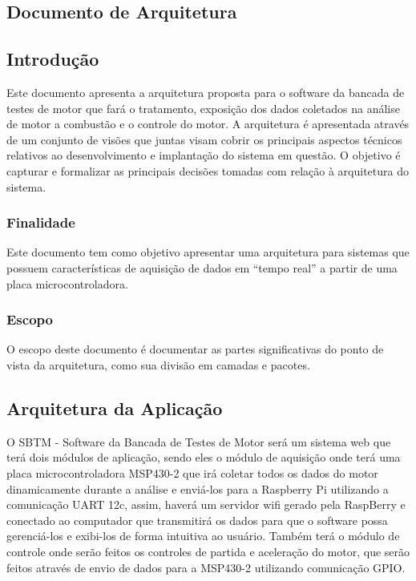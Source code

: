 \begin{anexosenv}
\chapter{Documento de Arquitetura}
\label{anexoB}

\section{Introdução}

Este documento apresenta a arquitetura proposta para o software da bancada de testes de motor que fará o tratamento, exposição dos dados coletados na análise de motor a combustão e o controle do motor. A arquitetura é apresentada através de um conjunto de visões que juntas visam cobrir os principais aspectos técnicos relativos ao desenvolvimento e implantação do sistema em questão. O objetivo é capturar e formalizar as principais decisões tomadas com relação à arquitetura do sistema.

\subsection{Finalidade}

Este documento tem como objetivo apresentar uma arquitetura para sistemas que possuem características de aquisição de dados em “tempo real” a partir de uma placa microcontroladora.

\subsection{Escopo}

O escopo deste documento é documentar as partes significativas do ponto de vista da arquitetura, como sua divisão em camadas e pacotes.

\section{Arquitetura da Aplicação}

O  SBTM - Software da Bancada de Testes de Motor será um sistema web que terá dois módulos de aplicação, sendo eles o módulo de aquisição onde terá uma placa microcontroladora MSP430-2 que irá coletar todos os dados do motor dinamicamente durante a análise e enviá-los para a Raspberry Pi utilizando a comunicação UART 12c, assim, haverá um servidor wifi gerado pela RaspBerry e conectado ao computador que transmitirá os dados para que o software possa gerenciá-los e exibi-los de forma intuitiva ao usuário. Também terá o módulo de controle onde serão feitos os controles de partida e aceleração do motor, que serão feitos através de envio de dados para a MSP430-2 utilizando comunicação GPIO.


\end{anexosenv}
